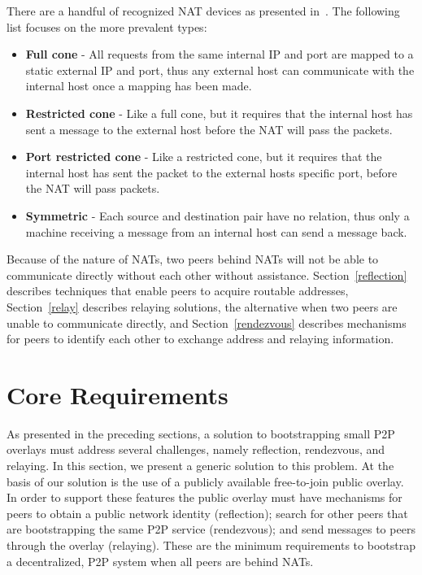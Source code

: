 \documentclass[conference]{IEEEtran}
\begin{document}
There are a handful of recognized NAT devices as presented in~\cite{stun,
p2p_nats_rfc}.  The following list focuses on the more prevalent types:
\begin{itemize}
\item \textbf{Full cone} - All requests from the same internal IP and port are
mapped to a static external IP and port, thus any external host can communicate
with the internal host once a mapping has been made.
\item \textbf{Restricted cone} - Like a full cone, but it requires that the
internal host has sent a message to the external host before the NAT will pass
the packets.
\item \textbf{Port restricted cone} - Like a restricted cone, but it requires
that the internal host has sent the packet to the external hosts specific port,
before the NAT will pass packets.
\item \textbf{Symmetric} - Each source and destination pair have no relation,
thus only a machine receiving a message from an internal host can send a
message back.
\end{itemize}

Because of the nature of NATs, two peers behind NATs will not be able to
communicate directly without each other without assistance.
Section~\ref{reflection} describes techniques that enable peers to acquire
routable addresses, Section~\ref{relay} describes relaying solutions, the
alternative when two peers are unable to communicate directly, and
Section~\ref{rendezvous} describes mechanisms for peers to identify each other
to exchange address and relaying information.

\section{Core Requirements}
\label{overview}

As presented in the preceding sections, a solution to bootstrapping small P2P
overlays must address several challenges, namely reflection, rendezvous, and
relaying.  In this section, we present a generic solution to this problem.  At
the basis of our solution is the use of a publicly available free-to-join
public overlay.  In order to support these features the public overlay must
have mechanisms for peers to obtain a public network identity (reflection);
search for other peers that are bootstrapping the same P2P service
(rendezvous); and send messages to peers through the overlay (relaying).  These
are the minimum requirements to bootstrap a decentralized, P2P system when all
peers are behind NATs.
\end{document}

